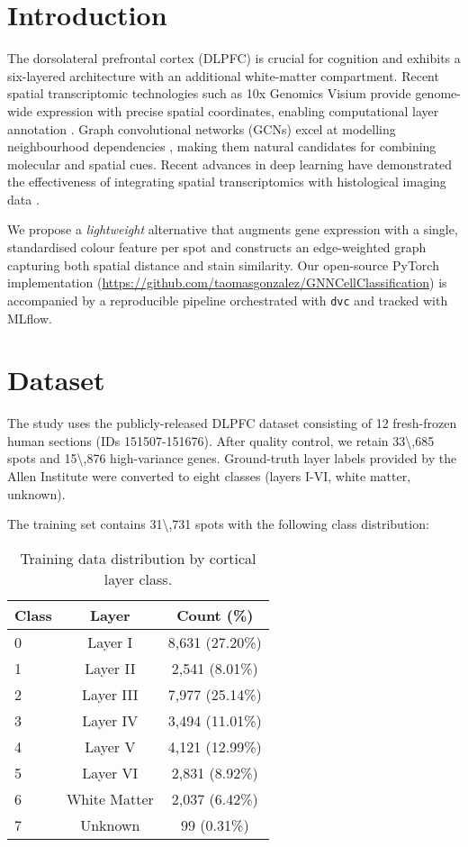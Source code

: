 \documentclass[conference]{IEEEtran}
\begin{document}
\section{Introduction}
The dorsolateral prefrontal cortex (DLPFC) is crucial for cognition and exhibits 
a six-layered architecture with an additional white-matter compartment. Recent 
spatial transcriptomic technologies such as 10x Genomics Visium provide 
genome-wide expression with precise spatial coordinates, enabling computational 
layer annotation \cite{huuki2022}. Graph convolutional networks (GCNs) excel at 
modelling neighbourhood dependencies \cite{kipf2017semi}, making them natural 
candidates for combining molecular and spatial cues. Recent advances in deep 
learning have demonstrated the effectiveness of integrating spatial 
transcriptomics with histological imaging data \cite{luo2025deep}.

We propose a \emph{lightweight} alternative that augments gene expression with a 
single, standardised colour feature per spot and constructs an edge-weighted 
graph capturing both spatial distance and stain similarity. Our open-source 
PyTorch implementation (\url{https://github.com/taomasgonzalez/GNNCellClassification}) 
is accompanied by a reproducible pipeline orchestrated with \texttt{dvc} and 
tracked with MLflow.

\section{Dataset}
The study uses the publicly-released DLPFC dataset consisting of 12 fresh-frozen 
human sections (IDs 151507-151676). After quality control, we retain 
\num{33\,685} spots and \num{15\,876} high-variance genes. Ground-truth layer 
labels provided by the Allen Institute were converted to eight classes (layers 
I-VI, white matter, unknown).

The training set contains \num{31\,731} spots with the following class 
distribution:

\begin{table}[H]
  \centering
  \caption{Training data distribution by cortical layer class.}
  \label{tab:train_dist}
  \begin{tabular}{lcc}
    \toprule
    Class & Layer & Count (\%) \\ \midrule
    0 & Layer I & 8,631 (27.20\%) \\
    1 & Layer II & 2,541 (8.01\%) \\
    2 & Layer III & 7,977 (25.14\%) \\
    3 & Layer IV & 3,494 (11.01\%) \\
    4 & Layer V & 4,121 (12.99\%) \\
    5 & Layer VI & 2,831 (8.92\%) \\
    6 & White Matter & 2,037 (6.42\%) \\
    7 & Unknown & 99 (0.31\%) \\ \bottomrule
  \end{tabular}
\end{table}
\end{document}
